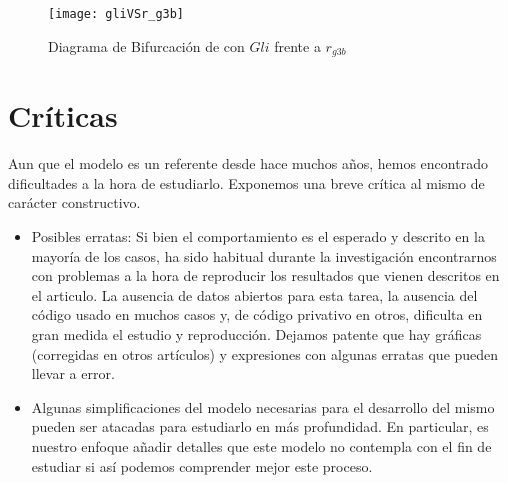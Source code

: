 \begin{figure}[h]
	\texttt{[image: gliVSr\_g3b]}
	\centering
	\caption{Diagrama de Bifurcación de \cite{schaffer} con $Gli$ frente a $r_{g3b}$}
	\label{lai_2}
\end{figure}

\section{Críticas}
Aun que el modelo es un referente desde hace muchos años, hemos encontrado dificultades a la hora de estudiarlo. Exponemos una breve crítica al mismo de carácter constructivo.
\begin{itemize}
	\item Posibles erratas: Si bien el comportamiento es el esperado y descrito en la mayoría de los casos, ha sido habitual durante la investigación encontrarnos con problemas a la hora de reproducir los resultados que vienen descritos en el articulo. 
	La ausencia de datos abiertos para esta tarea, la ausencia del código usado en muchos casos y, de código privativo en otros, dificulta en gran medida el estudio y reproducción. Dejamos patente que hay gráficas (corregidas en otros artículos) y expresiones con algunas erratas que pueden llevar a error.
	
	\item Algunas simplificaciones del modelo necesarias para el desarrollo del mismo pueden ser atacadas para estudiarlo en más profundidad. En particular, es nuestro enfoque añadir detalles que este modelo no contempla con el fin de estudiar si así podemos comprender mejor este proceso. 
\end{itemize}



